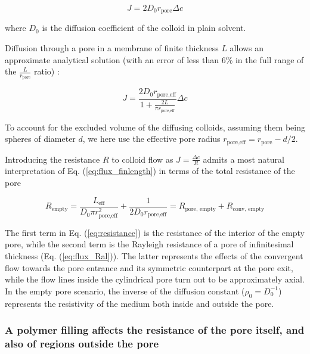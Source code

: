 \documentclass[12pt, a4paper]{article}
\begin{document}
\begin{equation}
    J=2D_0r_{\text{pore}}\Delta c
    \label{eq:flux_Ral}
\end{equation}

\noindent where $D_0$ is the diffusion coefficient of the colloid in plain solvent. 

Diffusion through a pore in a membrane of finite thickness $L$ allows an approximate analytical solution (with an error of less than 6\% in the full range of the $\frac{L}{r_{\text{pore}}}$ ratio) \cite{Brunn1984}: 

\begin{equation}
    J=\frac{2D_0r_{\text{pore,eff}}}{1+\frac{2L}{\pi r_{\text{pore,eff}}}}\Delta c
    \label{eq:flux_finlength}
\end{equation}

\noindent To account for the excluded volume of the diffusing colloids, assuming them being spheres of diameter $d$, we here use the effective pore radius $r_{\text{pore,eff}}=r_{\text{pore}}-d/2$.

Introducing the resistance $R$ to colloid flow as $J=\frac{\Delta c}{R}$ admits a most natural interpretation of Eq. (\ref{eq:flux_finlength}) in terms of the total resistance of the pore

\begin{equation}
    R_{\text{empty}}=\frac{L_{\text{eff}}}{D_0\pi r_{\text{pore,eff}}^{2}}+\frac{1}{2D_0r_{\text{pore,eff}}}=R_{\text{pore, empty}}+R_{\text{conv, empty}}
    \label{eq:resistance}
\end{equation}

\noindent The first term in Eq. (\ref{eq:resistance}) is the resistance of the interior of the empty pore, 
while the second term is the Rayleigh resistance of a pore of infinitesimal thickness (Eq. (\ref{eq:flux_Ral})). 
The latter represents the effects of the convergent flow towards the pore entrance and its symmetric counterpart at the pore exit, 
while the flow lines inside the cylindrical pore turn out to be approximately axial. 
In the empty pore scenario, the inverse of the diffusion constant ($\rho_0=D_0^{-1}$) represents the resistivity of the medium both inside and outside the pore. 

\subsubsection{A polymer filling affects the resistance of the pore itself, and also of regions outside the pore}
\end{document}
